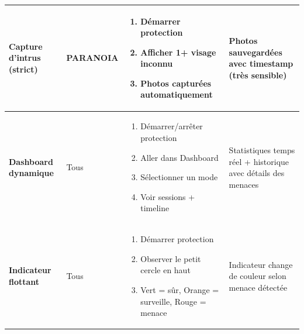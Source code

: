 \documentclass[11pt,a4paper]{article}
\begin{document}
\begin{center}
\begin{tabular}{p{3.5cm}p{2cm}p{6cm}p{3cm}}
\textbf{Capture d'intrus (strict)} & PARANOIA & 
\begin{minipage}[t]{6cm}
\vspace{-2mm}
\begin{enumerate}[leftmargin=*,topsep=0pt]
    \item Démarrer protection
    \item Afficher \textbf{1+ visage} inconnu
    \item Photos capturées automatiquement
\end{enumerate}
\vspace{-2mm}
\end{minipage} & 
Photos sauvegardées avec timestamp (très sensible) \\

\midrule

\textbf{Dashboard dynamique} & Tous & 
\begin{minipage}[t]{6cm}
\vspace{-2mm}
\begin{enumerate}[leftmargin=*,topsep=0pt]
    \item Démarrer/arrêter protection
    \item Aller dans Dashboard
    \item Sélectionner un mode
    \item Voir sessions + timeline
\end{enumerate}
\vspace{-2mm}
\end{minipage} & 
Statistiques temps réel + historique avec détails des menaces \\

\midrule

\textbf{Indicateur flottant} & Tous & 
\begin{minipage}[t]{6cm}
\vspace{-2mm}
\begin{enumerate}[leftmargin=*,topsep=0pt]
    \item Démarrer protection
    \item Observer le petit cercle en haut
    \item Vert = sûr, Orange = surveille, Rouge = menace
\end{enumerate}
\vspace{-2mm}
\end{minipage} & 
Indicateur change de couleur selon menace détectée \\

\bottomrule
\end{tabular}
\end{center}
\end{document}
